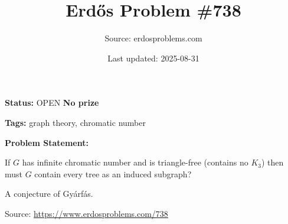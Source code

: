 \documentclass{article}
\title{Erd\H{o}s Problem \#738}
\date{Last updated: 2025-08-31}
\author{Source: erdosproblems.com}
\begin{document}
\maketitle

\noindent\textbf{Status:} OPEN \quad \textbf{No prize}

\noindent\textbf{Tags:} graph theory, chromatic number

\medskip

\noindent\textbf{Problem Statement:}

If $G$ has infinite chromatic number and is triangle-free (contains no $K_3$) then must $G$ contain every tree as an induced subgraph?




A conjecture of Gy\'{a}rf\'{a}s.


\bigskip
\noindent\small{Source: \url{https://www.erdosproblems.com/738}}
\end{document}
